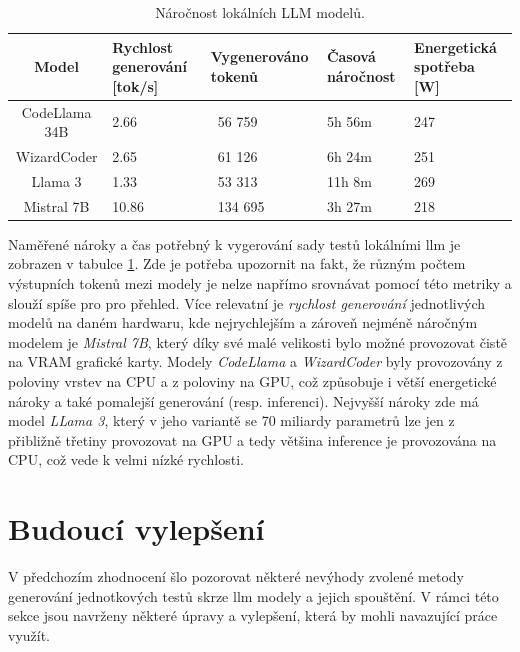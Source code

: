 \documentclass[czech, ma, kiv, he, iso690numb, pdf, viewonly]{fasthesis}
\begin{document}
    \begin{table}[H]
        \begin{tabular}{|c|p{2.5cm}|p{2.5cm}|p{2cm}|p{2cm}|}
            \hline
            \textbf{Model} & \textbf{Rychlost \linebreak generování} [tok/s] & \textbf{Vygenerováno tokenů} & \textbf{Časová \linebreak náročnost} & \textbf{Energetická spotřeba} [W] \\
            \hline
            CodeLlama 34B & 2.66 & 56 759 & 5h 56m & 247 \\
            \hline
            WizardCoder & 2.65 & 61 126 & 6h 24m & 251 \\
            \hline
            Llama 3 & 1.33 & 53 313 & 11h 8m & 269 \\
            \hline
            Mistral 7B & 10.86 & 134 695 & 3h 27m & 218 \\
            \hline
        \end{tabular}
        \centering
        \caption{Náročnost lokálních LLM modelů.}
        \label{tab:eval:local}
    \end{table}
 
    Naměřené nároky a čas potřebný k vygerování sady testů lokálními \Gls{llm} je zobrazen v tabulce \ref{tab:eval:local}. Zde je potřeba upozornit na fakt, že různým počtem výstupních tokenů mezi modely je nelze napřímo srovnávat pomocí této metriky a slouží spíše pro pro přehled. Více relevatní je \textit{rychlost generování} jednotlivých modelů na daném hardwaru, kde nejrychlejším a zároveň nejméně náročným modelem je \textit{Mistral 7B}, který díky své malé velikosti bylo možné provozovat čistě na VRAM grafické karty. Modely \textit{CodeLlama} a \textit{WizardCoder} byly provozovány z poloviny vrstev na CPU a z poloviny na GPU, což způsobuje i větší energetické nároky a také pomalejší generování (resp. inferenci). Nejvyšší nároky zde má model \textit{LLama 3}, který v jeho variantě se 70 miliardy parametrů lze jen z přibližně třetiny provozovat na GPU a tedy většina inference je provozována na CPU, což vede k velmi nízké rychlosti.

\chapter{Budoucí vylepšení} \label{sec:future_work}

    V předchozím zhodnocení šlo pozorovat některé nevýhody zvolené metody generování jednotkových testů skrze \Gls{llm} modely a jejich spouštění. V rámci této sekce jsou navrženy některé úpravy a vylepšení, která by mohli navazující práce využít.
\end{document}
